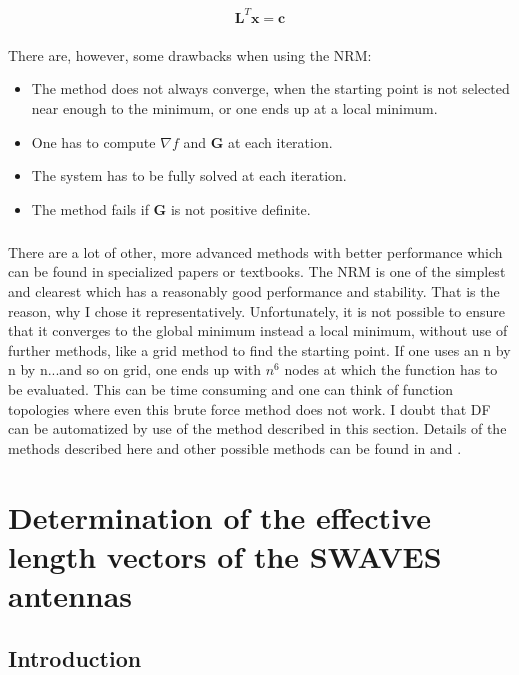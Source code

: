 \documentclass[a4paper,10pt]{thesis}
\begin{document}
\begin{equation}
\textbf{L}^T \textbf{x}=\textbf{c}
\end{equation}

\paragraph*{}
There are, however, some drawbacks when using the NRM:

\begin{itemize}
\item The method does not always converge, when the starting point is not selected near enough to the minimum, or one ends up at a local minimum.
\item One has to compute $\nabla f$ and $\textbf{G}$ at each iteration.
\item The system has to be fully solved at each iteration.
\item The method fails if \textbf{G} is not positive definite.
\end{itemize}

\paragraph*{}
There are a lot of other, more advanced methods with better performance which can be found in specialized papers or textbooks. The NRM is one of the simplest and clearest which has a reasonably good performance and stability. That is the reason, why I chose it representatively. Unfortunately, it is not possible to ensure that it converges to the global minimum instead a local minimum, without use of further methods, like a grid method to find the starting point. If one uses an n by n by n...and so on grid, one ends up with $n^6$ nodes at which the function has to be evaluated. This can be time consuming and one can think of function topologies where even this brute force method does not work. I doubt that DF can be automatized by use of the method described in this section. Details of the methods described here and other possible methods can be found in \cite{burdenfaires} and \cite{recipes}.

\chapter{\textbf{Determination of the effective length vectors of the SWAVES antennas}}
\section{\textbf{Introduction}}
\end{document}
